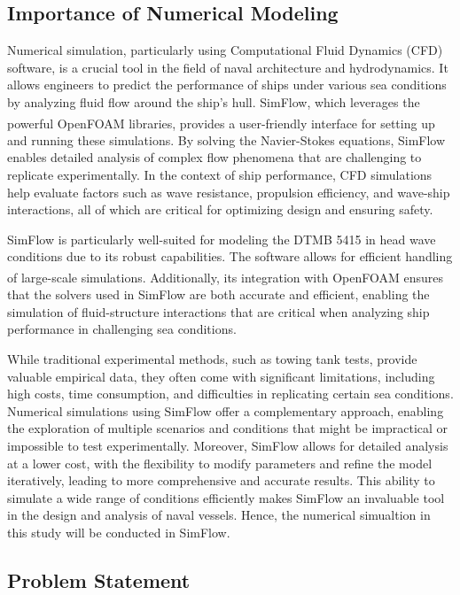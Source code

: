 \documentclass[12pt]{article} %
\begin{document}
\subsection{Importance of Numerical Modeling}
Numerical simulation, particularly using Computational Fluid Dynamics (CFD) software, is a crucial tool in the field of naval architecture and hydrodynamics. It allows engineers to predict the performance of ships under various sea conditions by analyzing fluid flow around the ship's hull. SimFlow, which leverages the powerful OpenFOAM\textsuperscript{\textregistered} libraries, provides a user-friendly interface for setting up and running these simulations. By solving the Navier-Stokes equations, SimFlow enables detailed analysis of complex flow phenomena that are challenging to replicate experimentally. In the context of ship performance, CFD simulations help evaluate factors such as wave resistance, propulsion efficiency, and wave-ship interactions, all of which are critical for optimizing design and ensuring safety.

SimFlow is particularly well-suited for modeling the DTMB 5415 in head wave conditions due to its 
robust capabilities. The software allows for efficient handling of large-scale 
simulations. Additionally, its integration with OpenFOAM\textsuperscript{\textregistered} ensures 
that the solvers used in SimFlow are both accurate and efficient, enabling the simulation of 
fluid-structure interactions that are critical when analyzing ship performance in challenging 
sea conditions.

While traditional experimental methods, such as towing tank tests, provide valuable empirical data, they often come with significant limitations, including high costs, time consumption, and difficulties in replicating certain sea conditions. Numerical simulations using SimFlow offer a complementary approach, enabling the exploration of multiple scenarios and conditions that might be impractical or impossible to test experimentally. Moreover, SimFlow allows for detailed analysis at a lower cost, with the flexibility to modify parameters and refine the model iteratively, leading to more comprehensive and accurate results. This ability to simulate a wide range of conditions efficiently makes SimFlow an invaluable tool in the design and analysis of naval vessels.
Hence, the numerical simualtion in this study will be conducted in SimFlow.

\subsection{Problem Statement}
\end{document}

